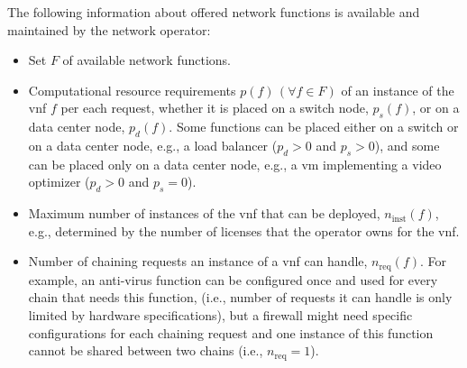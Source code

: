 \documentclass[10pt,a4paper,conference]{IEEEtran}
\begin{document}
The following information about offered network functions is available and 
maintained by the network operator:
\begin{itemize}
 \item Set $ F $ of available network functions.
 \item Computational resource requirements $ p(f) \, (\forall f \in F) $ of an 
 instance of the \ac{vnf} $ f $ per each request, whether it is placed on a switch 
 node, $ p_s(f) $, or on a data center node, $ p_d(f) $.
 Some functions can be placed either on a switch or on a data center node, e.g., 
 a load balancer ($ p_d {>} 0 $ and $ p_s {>} 0 $), and some can be placed only 
 on a data center node, e.g., a \ac{vm} implementing a video optimizer 
 ($ p_d {>} 0 $ and $ p_s {=} 0 $).
 \item Maximum number of instances of the \ac{vnf} that can be deployed, 
 $ n_{\text{inst}}(f) $, e.g., determined by the number 
 of licenses that the operator owns for the \ac{vnf}.
 \item Number of chaining requests an instance of a \ac{vnf} can handle, 
 $ n_{\text{req}}(f) $. For example, 
 an anti-virus function can be configured once and used for every chain that needs this function,
 (i.e., number of requests it can handle is only limited by hardware specifications),
 but a firewall might need specific configurations for each chaining request and
 one instance of this function cannot be shared between two chains (i.e., $ n_{\text{req}} {=} 1 $).
\end{itemize}
\end{document}
